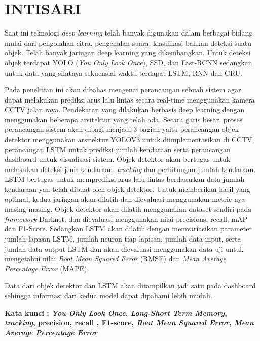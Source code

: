 \documentclass[../thesis.tex]{subfiles}
\begin{document}
\chapter*{INTISARI}%
\normalfont
\vspace{1.0cm}
\begin{singlespacing}%
{}

Saat ini teknologi \textit{deep learning} telah banyak digunakan dalam berbagai bidang mulai dari pengolahan citra, pengenalan suara, klasifikasi bahkan deteksi suatu objek. Telah banyak jaringan deep learning yang dikembangkan. Untuk deteksi objek terdapat
YOLO (\textit{You Only Look Once}), SSD, dan Fast-RCNN sedangkan untuk data yang sifatnya sekuensial waktu terdapat LSTM, RNN dan GRU. 

Pada penelitian ini akan dibahas mengenai perancangan sebuah sistem agar dapat melakukan prediksi arus lalu lintas secara real-time menggunakan kamera CCTV jalan raya. Pendekatan yang dilakukan berbasis deep learning dengan menggunakan beberapa arsitektur yang telah ada.
Secara garis besar, proses perancangan sistem akan dibagi menjadi 3 bagian yaitu perancangan objek detektor menggunakan arsitektur YOLOV3 untuk diimplementasikan di CCTV, perancangan LSTM untuk prediksi jumlah kendaraan serta perancangan dashboard untuk visualisasi sistem.
Objek detektor akan bertugas untuk melakukan deteksi jenis kendaraan, \textit{tracking} dan perhitungan jumlah kendaraan. LSTM bertugas untuk memprediksi arus lalu lintas berdasarkan data jumlah kendaraan yan telah dibuat oleh objek detektor. Untuk memberikan hasil yang optimal, kedua jaringan akan dilatih dan dievaluasi menggunakan metric nya masing-masing. 
Objek detektor akan dilatih menggunakan dataset sendiri pada \textit{framework} Darknet, dan dievaluasi menggunakan nilai precisions, recall, mAP dan F1-Score. 
Sedangkan LSTM akan dilatih dengan memvariasikan parameter jumlah lapisan LSTM, jumlah neuron tiap lapisan, jumlah data input, serta jumlah data output LSTM dan akan dievaluasi menggunakan data uji untuk mengetahui nilai \textit{Root Mean Squared Error} (RMSE) dan \textit{Mean Average Percentage Error} (MAPE). 

Data dari objek detektor dan LSTM akan ditampilkan jadi satu pada dashboard sehingga informasi dari kedua model dapat dipahami lebih mudah.

\bigskip
\noindent
\textbf{Kata kunci : \textit{You Only Look Once}, \textit{Long-Short Term Memory}, \textit{tracking}, precision, recall , F1-score, \textit{Root Mean Squared Error}, \textit{Mean Average Percentage Error } }
\end{singlespacing}
\end{document}
